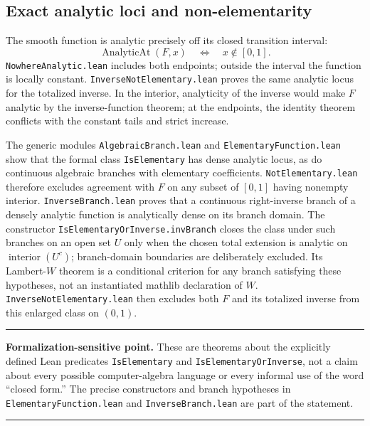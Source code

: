 \documentclass[11pt,oneside]{article}
\theoremstyle{definition}
\theoremstyle{remark}
\newenvironment{boxedremark}{%
  \par\smallskip\noindent\begin{center}\begin{minipage}{0.94\textwidth}%
  \color{black}\hrule\vspace{0.6em}\small
}{%
  \vspace{0.6em}\hrule\end{minipage}\end{center}\smallskip
}
\begin{document}
\subsection{Exact analytic loci and non-elementarity}
The smooth function is analytic precisely off its closed transition interval:
\[
  \operatorname{AnalyticAt}(F,x)\quad\Longleftrightarrow\quad
  x\notin[0,1].
\]
\nolinkurl{NowhereAnalytic.lean} includes both endpoints; outside the interval the
function is locally constant.  \nolinkurl{InverseNotElementary.lean} proves the
same analytic locus for the totalized inverse.  In the interior, analyticity
of the inverse would make \(F\) analytic by the inverse-function theorem; at
the endpoints, the identity theorem conflicts with the constant tails and
strict increase.

The generic modules \nolinkurl{AlgebraicBranch.lean} and
\nolinkurl{ElementaryFunction.lean} show that the formal class
\nolinkurl{IsElementary} has dense analytic locus, as do continuous algebraic
branches with elementary coefficients.  \nolinkurl{NotElementary.lean}
therefore excludes agreement with \(F\) on any subset of \([0,1]\) having
nonempty interior.  \nolinkurl{InverseBranch.lean} proves that a continuous
right-inverse branch of a densely analytic function is analytically dense on
its branch domain.  The constructor \nolinkurl{IsElementaryOrInverse.invBranch}
closes the class under such branches on an open set \(U\) only when the chosen
total extension is analytic on \(\operatorname{interior}(U^c)\); branch-domain
boundaries are deliberately excluded.  Its Lambert-\(W\) theorem is a
conditional criterion for any branch satisfying these hypotheses, not an
instantiated mathlib declaration of \(W\).  \nolinkurl{InverseNotElementary.lean}
then excludes both \(F\) and its totalized inverse from this enlarged class on
\((0,1)\).

\begin{boxedremark}\textbf{Formalization-sensitive point.}\space
These are theorems about the explicitly defined Lean predicates
\nolinkurl{IsElementary} and \nolinkurl{IsElementaryOrInverse}, not a claim about every
possible computer-algebra language or every informal use of the word
``closed form.''  The precise constructors and branch hypotheses in
\nolinkurl{ElementaryFunction.lean} and \nolinkurl{InverseBranch.lean} are part of the
statement.
\end{boxedremark}
\end{document}
